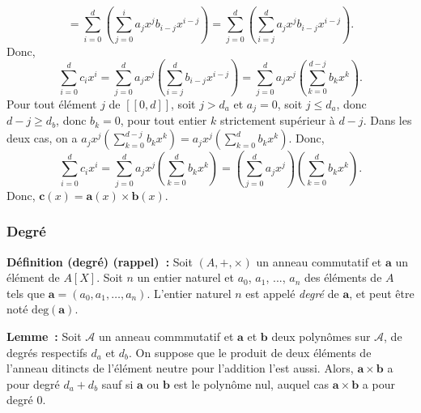 \begin{itemize}[nosep]
\begin{equation*}
                    = \sum_{i=0}^d \left( \sum_{j=0}^i a_j x^j b_{i-j} x^{i-j} \right)
                    = \sum_{j=0}^d \left( \sum_{i=j}^d a_j x^j b_{i-j} x^{i-j} \right).
            \end{equation*}
            Donc, 
            \begin{equation*}
                \sum_{i=0}^d c_i x^i 
                    = \sum_{j=0}^d a_j x^j \left( \sum_{i=j}^d b_{i-j} x^{i-j} \right)
                    = \sum_{j=0}^d a_j x^j \left( \sum_{k=0}^{d-j} b_k x^k \right).
            \end{equation*}
            Pour tout élément $j$ de $[\![0, d]\!]$, soit $j > d_a$ et $a_j = 0$, soit $j \leq d_a$, donc $d - j \geq d_b$, donc $b_k = 0$, pour tout entier $k$ strictement supérieur à $d-j$. 
            Dans les deux cas, on a $a_j x^j \left( \sum_{k=0}^{d-j} b_k x^k \right) = a_j x^j \left( \sum_{k=0}^{d} b_k x^k \right)$.
            Donc, 
            \begin{equation*}
                \sum_{i=0}^d c_i x^i 
                    = \sum_{j=0}^d a_j x^j \left( \sum_{k=0}^d b_k x^k \right)
                    = \left( \sum_{j=0}^d a_j x^j \right) \left( \sum_{k=0}^d b_k x^k \right).
            \end{equation*}
            Donc, $\mathbf{c}(x) = \mathbf{a}(x) \times \mathbf{b}(x)$.
    \end{itemize}

    \done

\subsubsection{Degré}

\noindent\textbf{Définition (degré) (rappel) :} Soit $(A, +, \times)$ un anneau commutatif et $\mathbf{a}$ un élément de $A[X]$.
    Soit $n$ un entier naturel et $a_0$, $a_1$, ..., $a_n$ des éléments de $A$ tels que $\mathbf{a} = (a_0, a_1, \dots, a_n)$.
    L'entier naturel $n$ est appelé \textit{degré} de $\mathbf{a}$, et peut être noté $\mathrm{deg}(\mathbf{a})$. 
\medskip

\noindent\textbf{Lemme :} Soit $\mathcal{A}$ un anneau commmutatif et $\mathbf{a}$ et $\mathbf{b}$ deux polynômes sur $\mathcal{A}$, de degrés respectifs $d_a$ et $d_b$. 
    On suppose que le produit de deux éléments de l'anneau ditincts de l'élément neutre pour l'addition l'est aussi.
    Alors, $\mathbf{a} \times \mathbf{b}$ a pour degré $d_a + d_b$ sauf si $\mathbf{a}$ ou $\mathbf{b}$ est le polynôme nul, auquel cas $\mathbf{a} \times \mathbf{b}$ a pour degré $0$.

